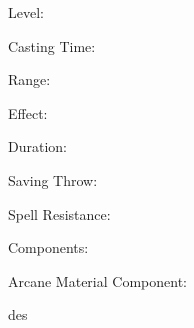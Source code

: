 \spellentry{}
\tagline{}
\begin{description*}
\item[Level:]
\item[Casting Time:]
\item[Range:]
\item[Effect:]
\item[Duration:]
\item[Saving Throw:]
\item[Spell Resistance:]
\item[Components:]
\item[Arcane Material Component:]
\end{description*}

des